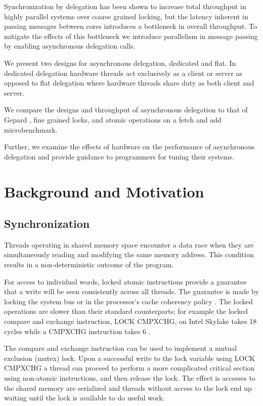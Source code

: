 \documentclass{uicthesi}
\begin{document}
\summary
Synchronization by delegation has been shown to increase total throughput in highly parallel systems over coarse grained locking, \cite{ffwd} but the latency inherent in passing messages between cores introduces a bottleneck in overall throughput. To mitigate the effects of this bottleneck we introduce parallelism in message passing by enabling asynchronous delegation calls. 

We present two designs for asynchronous delegation, dedicated and flat. In dedicated delegation hardware threads act exclusively as a client or server as opposed to flat delegation where hardware threads share duty as both client and server. 

We compare the designs and throughput of asynchronous delegation to that of Gepard \cite{gepard}, fine grained locks, and atomic operations on a fetch and add microbenchmark. 

Further, we examine the effects of hardware on the performance of asynchronous delegation and provide guidance to programmers for tuning their systems. 

\chapter{Background and Motivation}
\section{Synchronization}
Threads operating in shared memory space encounter a data race when they are simultaneously reading and modifying the same memory address. This condition results in a non-deterministic outcome of the program. 

For access to individual words, locked atomic instructions provide a guarantee that a write will be seen consistently across all threads. The guarantee is made by locking the system bus or in the processor's cache coherency policy \cite{IntelDevelopersManual}. The locked operations are slower than their standard counterparts; for example the locked compare and exchange instruction, LOCK CMPXCHG, on Intel Skylake takes 18 cycles while a CMPXCHG  instruction takes 6 \cite{agner}. 

The compare and exchange instruction can be used to implement a mutual exclusion (mutex) lock. Upon a successful write to the lock variable using LOCK CMPXCHG a thread can proceed to perform a more complicated critical section using non-atomic instructions, and then release the lock. The effect is accesses to the shared memory are serialized and threads without access to the lock end up waiting until the lock is available to do useful work. 
\end{document}
